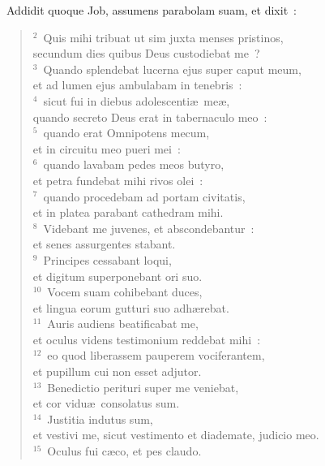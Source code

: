 ~\lettrine[lines=10,image=true,loversize=0.05,lraise=-0.03]{A}{}ddidit quoque Job, assumens parabolam suam, et dixit~:
\begin{flushleft}\begin{verse}\vspace{6pt}${}^{2}$~Quis mihi tribuat ut sim juxta menses pristinos,\\ secundum dies quibus Deus custodiebat me~?\\
${}^{3}$~Quando splendebat lucerna ejus super caput meum,\\ et ad lumen ejus ambulabam in tenebris~:\\
${}^{4}$~sicut fui in diebus adolescenti\ae\ me\ae ,\\ quando secreto Deus erat in tabernaculo meo~:\\
${}^{5}$~quando erat Omnipotens mecum,\\ et in circuitu meo pueri mei~:\\
${}^{6}$~quando lavabam pedes meos butyro,\\ et petra fundebat mihi rivos olei~:\\
${}^{7}$~quando procedebam ad portam civitatis,\\ et in platea parabant cathedram mihi.\\
${}^{8}$~Videbant me juvenes, et abscondebantur~:\\ et senes assurgentes stabant.\\
${}^{9}$~Principes cessabant loqui,\\ et digitum superponebant ori suo.\\
${}^{10}$~Vocem suam cohibebant duces,\\ et lingua eorum gutturi suo adh\ae rebat.\\
${}^{11}$~Auris audiens beatificabat me,\\ et oculus videns testimonium reddebat mihi~:\\
${}^{12}$~eo quod liberassem pauperem vociferantem,\\ et pupillum cui non esset adjutor.\\
${}^{13}$~Benedictio perituri super me veniebat,\\ et cor vidu\ae\ consolatus sum.\\
${}^{14}$~Justitia indutus sum,\\ et vestivi me, sicut vestimento et diademate, judicio meo.\\
${}^{15}$~Oculus fui c\ae co, et pes claudo.\\

\end{verse}
\end{flushleft}
